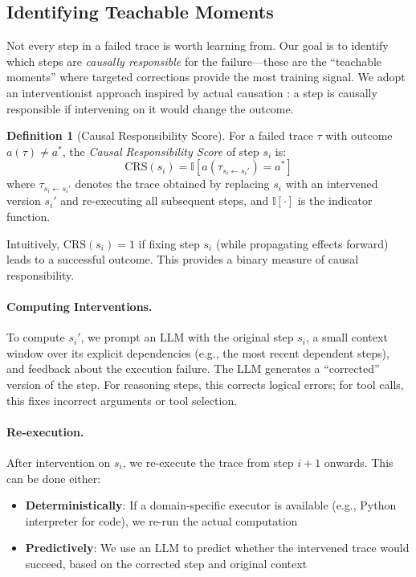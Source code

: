 \documentclass{article}
\theoremstyle{plain}
\theoremstyle{definition}
\newtheorem{definition}[theorem]{Definition}
\theoremstyle{remark}
\begin{document}
\subsection{Identifying Teachable Moments}

Not every step in a failed trace is worth learning from. Our goal is to identify which steps are \emph{causally responsible} for the failure---these are the ``teachable moments'' where targeted corrections provide the most training signal. We adopt an interventionist approach inspired by actual causation \cite{halpern2005causes}: a step is causally responsible if intervening on it would change the outcome.

\begin{definition}[Causal Responsibility Score]
For a failed trace $\tau$ with outcome $a(\tau) \neq a^*$, the \emph{Causal Responsibility Score} of step $s_i$ is:
\begin{equation}
    \text{CRS}(s_i) = \mathbb{I}\left[ a(\tau_{s_i \leftarrow s_i'}) = a^* \right]
\end{equation}
where $\tau_{s_i \leftarrow s_i'}$ denotes the trace obtained by replacing $s_i$ with an intervened version $s_i'$ and re-executing all subsequent steps, and $\mathbb{I}[\cdot]$ is the indicator function.
\end{definition}

Intuitively, $\text{CRS}(s_i) = 1$ if fixing step $s_i$ (while propagating effects forward) leads to a successful outcome. This provides a binary measure of causal responsibility.

\paragraph{Computing Interventions.}
To compute $s_i'$, we prompt an LLM with the original step $s_i$, a small context window over its explicit dependencies (e.g., the most recent dependent steps), and feedback about the execution failure. The LLM generates a ``corrected'' version of the step. For reasoning steps, this corrects logical errors; for tool calls, this fixes incorrect arguments or tool selection.

\paragraph{Re-execution.}
After intervention on $s_i$, we re-execute the trace from step $i+1$ onwards. This can be done either:
\begin{itemize}
    \item \textbf{Deterministically}: If a domain-specific executor is available (e.g., Python interpreter for code), we re-run the actual computation
    \item \textbf{Predictively}: We use an LLM to predict whether the intervened trace would succeed, based on the corrected step and original context
\end{itemize}
\end{document}

